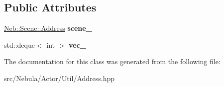 \subsection*{\-Public \-Attributes}
\begin{DoxyCompactItemize}
\item 
\hypertarget{classNeb_1_1Actor_1_1Util_1_1Address_a9f866b204abdacf50f0e0b32eac7993b}{\hyperlink{classNeb_1_1Scene_1_1Address}{\-Neb\-::\-Scene\-::\-Address} {\bfseries scene\-\_\-}}\label{classNeb_1_1Actor_1_1Util_1_1Address_a9f866b204abdacf50f0e0b32eac7993b}

\item 
\hypertarget{classNeb_1_1Actor_1_1Util_1_1Address_aa9d6e45cf09caf8475a2ee6b6c79892b}{std\-::deque$<$ int $>$ {\bfseries vec\-\_\-}}\label{classNeb_1_1Actor_1_1Util_1_1Address_aa9d6e45cf09caf8475a2ee6b6c79892b}

\end{DoxyCompactItemize}


\-The documentation for this class was generated from the following file\-:\begin{DoxyCompactItemize}
\item 
src/\-Nebula/\-Actor/\-Util/\-Address.\-hpp\end{DoxyCompactItemize}
